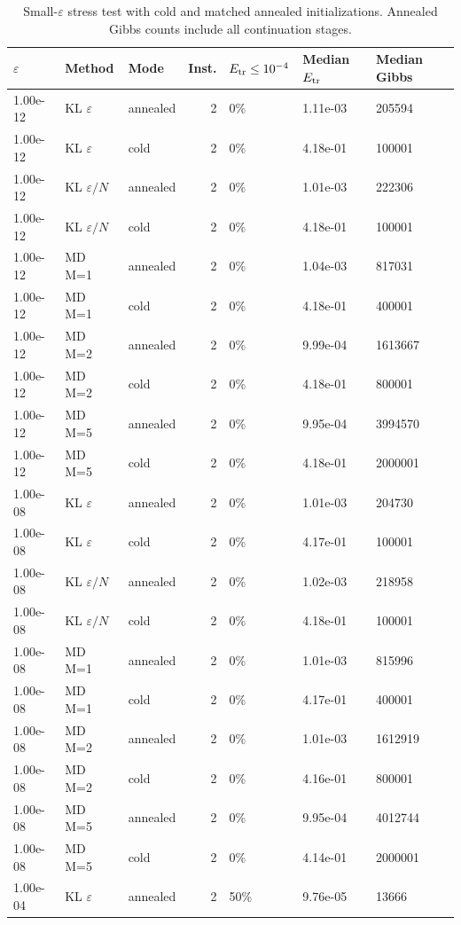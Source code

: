 \begin{table}
\caption{Small-$\varepsilon$ stress test with cold and matched annealed initializations. Annealed Gibbs counts include all continuation stages.}
\label{tab:warm-small-eps}
\begin{tabular}{lllrlll}
\toprule
$\varepsilon$ & Method & Mode & Inst. & $E_{\rm tr}\le 10^{-4}$ & Median $E_{\rm tr}$ & Median Gibbs \\
\midrule
1.00e-12 & KL $\varepsilon$ & annealed & 2 & 0\% & 1.11e-03 & 205594 \\
1.00e-12 & KL $\varepsilon$ & cold & 2 & 0\% & 4.18e-01 & 100001 \\
1.00e-12 & KL $\varepsilon/N$ & annealed & 2 & 0\% & 1.01e-03 & 222306 \\
1.00e-12 & KL $\varepsilon/N$ & cold & 2 & 0\% & 4.18e-01 & 100001 \\
1.00e-12 & MD M=1 & annealed & 2 & 0\% & 1.04e-03 & 817031 \\
1.00e-12 & MD M=1 & cold & 2 & 0\% & 4.18e-01 & 400001 \\
1.00e-12 & MD M=2 & annealed & 2 & 0\% & 9.99e-04 & 1613667 \\
1.00e-12 & MD M=2 & cold & 2 & 0\% & 4.18e-01 & 800001 \\
1.00e-12 & MD M=5 & annealed & 2 & 0\% & 9.95e-04 & 3994570 \\
1.00e-12 & MD M=5 & cold & 2 & 0\% & 4.18e-01 & 2000001 \\
1.00e-08 & KL $\varepsilon$ & annealed & 2 & 0\% & 1.01e-03 & 204730 \\
1.00e-08 & KL $\varepsilon$ & cold & 2 & 0\% & 4.17e-01 & 100001 \\
1.00e-08 & KL $\varepsilon/N$ & annealed & 2 & 0\% & 1.02e-03 & 218958 \\
1.00e-08 & KL $\varepsilon/N$ & cold & 2 & 0\% & 4.18e-01 & 100001 \\
1.00e-08 & MD M=1 & annealed & 2 & 0\% & 1.01e-03 & 815996 \\
1.00e-08 & MD M=1 & cold & 2 & 0\% & 4.17e-01 & 400001 \\
1.00e-08 & MD M=2 & annealed & 2 & 0\% & 1.01e-03 & 1612919 \\
1.00e-08 & MD M=2 & cold & 2 & 0\% & 4.16e-01 & 800001 \\
1.00e-08 & MD M=5 & annealed & 2 & 0\% & 9.95e-04 & 4012744 \\
1.00e-08 & MD M=5 & cold & 2 & 0\% & 4.14e-01 & 2000001 \\
1.00e-04 & KL $\varepsilon$ & annealed & 2 & 50\% & 9.76e-05 & 13666 \\

\end{tabular}
\end{table}

